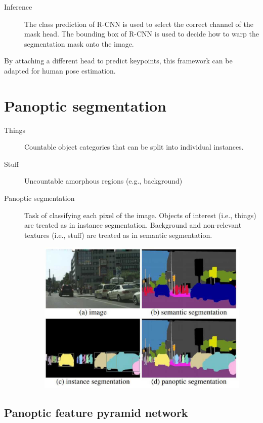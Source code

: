 \begin{description}
\begin{description}
        \item[Inference]
            The class prediction of R-CNN is used to select the correct channel of the mask head. The bounding box of R-CNN is used to decide how to warp the segmentation mask onto the image.
    \end{description}
\end{description}

\begin{remark}
    By attaching a different head to predict keypoints, this framework can be adapted for human pose estimation.
\end{remark}



\section{Panoptic segmentation}

\begin{description}
    \item[Things] 
        Countable object categories that can be split into individual instances.

    \item[Stuff] 
        Uncountable amorphous regions (e.g., background)

    \item[Panoptic segmentation] 
        Task of classifying each pixel of the image. Objects of interest (i.e., things) are treated as in instance segmentation. Background and non-relevant textures (i.e., stuff) are treated as in semantic segmentation.

        \begin{figure}[H]
            \centering
            \includegraphics[width=0.5\linewidth]{./img/segmentation_types.jpg}
        \end{figure}
\end{description}


\subsection{Panoptic feature pyramid network}

